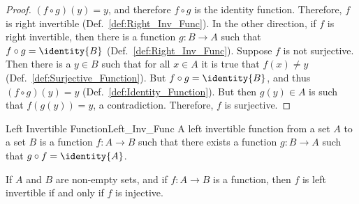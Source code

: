 \begin{proof}
            $(f\circ{g})(y)=y$, and therefore $f\circ{g}$ is the identity
            function. Therefore, $f$ is right invertible
            (Def.~\ref{def:Right_Inv_Func}). In the other direction, if $f$ is
            right invertible, then there is a function $g:B\rightarrow{A}$ such
            that $f\circ{g}=\identity{B}$ (Def.~\ref{def:Right_Inv_Func}).
            Suppose $f$ is not surjective. Then there is a $y\in{B}$ such that
            for all $x\in{A}$ it is true that $f(x)\ne{y}$
            (Def.~\ref{def:Surjective_Function}). But $f\circ{g}=\identity{B}$,
            and thus $(f\circ{g})(y)=y$ (Def.~\ref{def:Identity_Function}). But
            then $g(y)\in{A}$ is such that $f(g(y))=y$, a contradiction.
            Therefore, $f$ is surjective.
        \end{proof}
        \begin{fdefinition}{Left Invertible Function}{Left_Inv_Func}
            A left invertible function from a set $A$ to a set $B$ is a function
            $f:A\rightarrow{B}$ such that there exists a function
            $g:B\rightarrow{A}$ such that $g\circ{f}=\identity{A}$.
        \end{fdefinition}
        \begin{theorem}
            \label{thm:Left_Inv_iff_Inj}%
            If $A$ and $B$ are non-empty sets, and if $f:A\rightarrow{B}$ is a
            function, then $f$ is left invertible if and only if $f$ is
            injective.
        \end{theorem}
